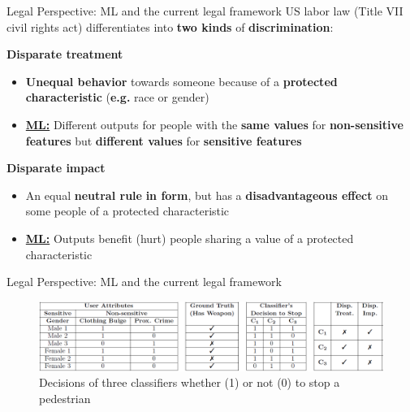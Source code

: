 \begin{frame}{Legal Perspective: ML and the current legal framework \cite{Barocas.2016}}
US labor law (Title VII civil rights act) differentiates into \textbf{two kinds} of \textbf{discrimination}: \newline

\begin{block}{\textbf{Disparate treatment} \cite{Barocas.2016, isabel01, isabel02}}
\begin{itemize}
    \item  \textbf{Unequal behavior} towards someone because of a \textbf{protected characteristic} (\textbf{e.g.} race or gender)
    \item \underline{\textbf{ML:}} Different outputs for people with the \textbf{same values} for \textbf{non-sensitive features} but \textbf{different values} for \textbf{sensitive features}
\end{itemize}
\end{block}

\begin{block}{\textbf{Disparate impact} \cite{Barocas.2016, isabel01, isabel02}}
\begin{itemize}
    \item An equal \textbf{neutral rule} \textbf{in form}, but has a \textbf{disadvantageous effect} on some people of a protected characteristic
    \item \underline{\textbf{ML:}} Outputs benefit (hurt) people sharing a value of a protected characteristic
\end{itemize}
\end{block}
\end{frame}

\begin{frame}{Legal Perspective: ML and the current legal framework \cite{isabel01}}
\begin{figure}
    \vspace{1cm}
    \centering
    \includegraphics[width=\textwidth]{presentation/assets/DisparateTreatImp.PNG}
    \caption{Decisions of three classifiers whether (1) or not (0) to stop a pedestrian \cite{isabel01, isabel02}}
    \label{fig:exampleDisp}
\end{figure}
\end{frame}

